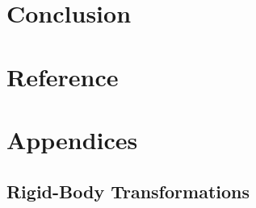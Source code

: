 \documentclass[a4paper]{report}
\numberwithin{figure}{section}
\begin{document}
\chapter{Conclusion} \label{cp_conc}

\chapter{Reference} \label{cp_ref}


\chapter{Appendices} \label{cp_appendices}

\section{Rigid-Body Transformations} \label{sc_rigid_body_transformations}
\end{document}
